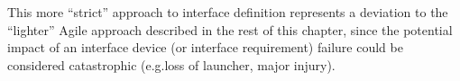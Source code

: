 \documentclass[a4paper,nobib,justified,final]{tufte-book}
\begin{document}
This more ``strict'' approach to interface definition represents a deviation to the ``lighter'' Agile approach described in the rest of this chapter, since the potential impact of an interface device (or interface requirement) failure could be considered catastrophic (e.g.\@ loss of launcher, major injury). 


\end{document}
